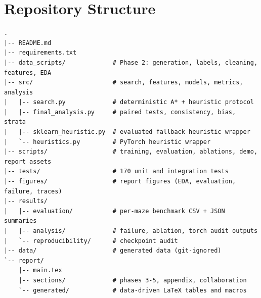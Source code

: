 \documentclass[11pt]{article}
\begin{document}
\appendix


\section{Repository Structure}
{\small
\begin{verbatim}
.
|-- README.md
|-- requirements.txt
|-- data_scripts/             # Phase 2: generation, labels, cleaning, features, EDA
|-- src/                      # search, features, models, metrics, analysis
|   |-- search.py             # deterministic A* + heuristic protocol
|   |-- final_analysis.py     # paired tests, consistency, bias, strata
|   |-- sklearn_heuristic.py  # evaluated fallback heuristic wrapper
|   `-- heuristics.py         # PyTorch heuristic wrapper
|-- scripts/                  # training, evaluation, ablations, demo, report assets
|-- tests/                    # 170 unit and integration tests
|-- figures/                  # report figures (EDA, evaluation, failure, traces)
|-- results/
|   |-- evaluation/           # per-maze benchmark CSV + JSON summaries
|   |-- analysis/             # failure, ablation, torch audit outputs
|   `-- reproducibility/      # checkpoint audit
|-- data/                     # generated data (git-ignored)
`-- report/
    |-- main.tex
    |-- sections/             # phases 3-5, appendix, collaboration
    `-- generated/            # data-driven LaTeX tables and macros
\end{verbatim}
}
\end{document}
